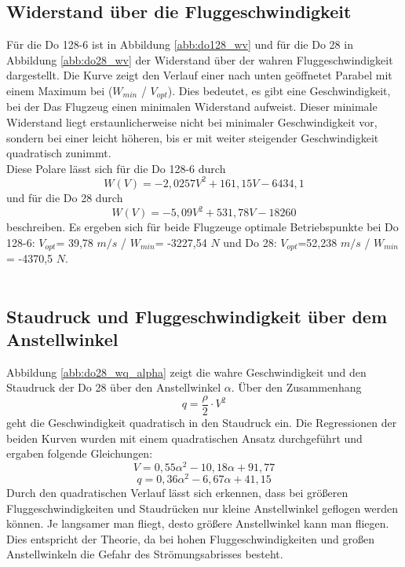 \subsection{Widerstand über die Fluggeschwindigkeit}
Für die Do 128-6 ist in Abbildung \ref{abb:do128_wv} und für die Do 28 in Abbildung \ref{abb:do28_wv} der Widerstand über der wahren Fluggeschwindigkeit dargestellt. Die Kurve zeigt den Verlauf einer nach unten geöffnetet Parabel mit einem Maximum bei ($W_{min}$ / $V_{opt}$). Dies bedeutet, es gibt eine Geschwindigkeit, bei der Das Flugzeug einen minimalen Widerstand aufweist. Dieser minimale Widerstand liegt erstaunlicherweise nicht bei minimaler Geschwindigkeit vor, sondern bei einer leicht höheren, bis er mit weiter steigender Geschwindigkeit quadratisch zunimmt. \\
Diese Polare lässt sich für die Do 128-6 durch 
\begin{equation}
W(V)=-2,0257V^2+161,15V-6434,1
\end{equation}
und für die Do 28 durch 
\begin{equation}
W(V)=-5,09V^2+531,78V-18260
\end{equation}
 beschreiben. Es ergeben sich für beide Flugzeuge optimale Betriebspunkte bei Do 128-6: $V_{opt}$= 39,78 $m/s$ / 
$W_{min}$= -3227,54 $N$ und Do 28: $V_{opt}$=52,238 $m/s$ / 
$W_{min}$= -4370,5 $N$.
\\\\
\subsection{Staudruck und Fluggeschwindigkeit über dem Anstellwinkel}
Abbildung \ref{abb:do28_wq_alpha} zeigt die wahre Geschwindigkeit und den Staudruck der Do 28 über den Anstellwinkel $\alpha$. Über den Zusammenhang 
\begin{equation}
q = \frac{\rho}{2} \cdot V^2
\end{equation}
geht die Geschwindigkeit quadratisch in den Staudruck ein.
Die Regressionen der beiden Kurven wurden mit einem quadratischen Ansatz durchgeführt und ergaben folgende Gleichungen:
\begin{equation}
V = 0,55\alpha^2 - 10,18\alpha +91,77
\end{equation}
\begin{equation}
q = 0,36\alpha^2 -6,67\alpha +41,15
\end{equation}
Durch den quadratischen Verlauf lässt sich erkennen, dass bei größeren Fluggeschwindigkeiten und Staudrücken nur kleine Anstellwinkel geflogen werden können. Je langsamer man fliegt, desto größere Anstellwinkel kann man fliegen. Dies entspricht der Theorie, da bei hohen Fluggeschwindigkeiten und großen Anstellwinkeln die Gefahr des Strömungsabrisses besteht.
\newpage

